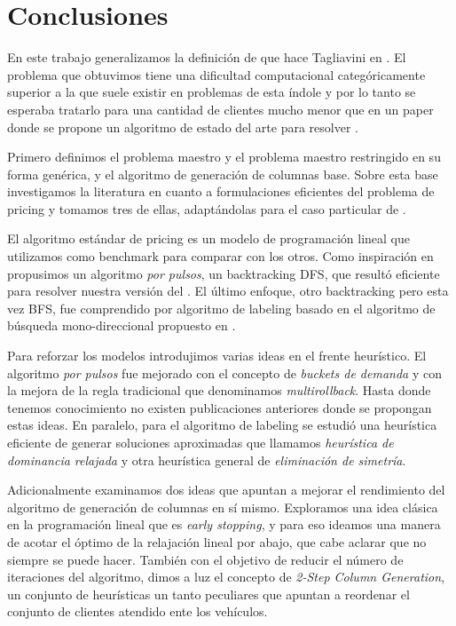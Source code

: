 \chapter{Conclusiones}

En este trabajo generalizamos la definición de  que hace Tagliavini en \cite{tagliavini}. El problema que obtuvimos tiene una dificultad computacional categóricamente superior a la que suele existir en problemas de esta índole y por lo tanto se esperaba tratarlo para una cantidad de clientes mucho menor que en un paper donde se propone un algoritmo de estado del arte para resolver . 

Primero definimos el problema maestro y el problema maestro restringido en su forma genérica, y el algoritmo de generación de columnas base. Sobre esta base investigamos la literatura en cuanto a formulaciones eficientes del problema de pricing y tomamos tres de ellas, adaptándolas para el caso particular de .

El algoritmo estándar de pricing es un modelo de programación lineal que utilizamos como benchmark para comparar con los otros. Como inspiración en \cite{lozano-duque-medaglia} propusimos un algoritmo \emph{por pulsos}, un backtracking DFS, que resultó eficiente para resolver nuestra versión del . El último enfoque, otro backtracking pero esta vez BFS, fue comprendido por algoritmo de labeling basado en el algoritmo de búsqueda mono-direccional propuesto en \cite{righini-salani}. 

Para reforzar los modelos introdujimos varias ideas en el frente heurístico. El algoritmo \emph{por pulsos} fue mejorado con el concepto de \emph{buckets de demanda} y con la mejora de la regla tradicional que denominamos \emph{multirollback}. Hasta donde tenemos conocimiento no existen publicaciones anteriores donde se propongan estas ideas. En paralelo, para el algoritmo de labeling se estudió una heurística eficiente de generar soluciones aproximadas que llamamos \emph{heurística de dominancia relajada} y otra heurística general de \emph{eliminación de simetría}.

Adicionalmente examinamos dos ideas que apuntan a mejorar el rendimiento del algoritmo de generación de columnas en sí mismo. Exploramos una idea clásica en la programación lineal que es \emph{early stopping}, y para eso ideamos una manera de acotar el óptimo de la relajación lineal por abajo, que cabe aclarar que no siempre se puede hacer. También con el objetivo de reducir el número de iteraciones del algoritmo, dimos a luz el concepto de \emph{2-Step Column Generation}, un conjunto de heurísticas un tanto peculiares que apuntan a reordenar el conjunto de clientes atendido ente los vehículos.


